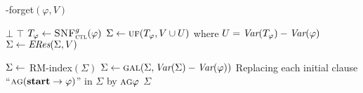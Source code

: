\begin{algorithm}[tb]
	\caption{{\CTL-forget}$(\varphi, V)$}
	\label{alg:compute:forgetting:by:Resolution}
	\LinesNumbered
	\lIf{$\varphi\equiv\bot$} {{\bf \Return $\bot$}}
	 {{\bf \Return  $\top$}}
	$T_\varphi \leftarrow {\textsc{SNF}_{\textsc{ctl}}^g}(\varphi)$ 
	$\Sigma\leftarrow \textsc{uf}(T_\varphi,V\cup U)$ where $U=\textit{Var}(T_\varphi)-\textit{Var}(\varphi)$
	$\Sigma\leftarrow \emph{ERes}(\Sigma,V)$ 
	
	$\Sigma\leftarrow$ {RM-index}$(\Sigma)$ 
	$\Sigma\leftarrow \textsc{gal}(\Sigma,\textit{Var}(\Sigma)-\textit{Var}(\varphi))$ 
	Replacing each initial clause ``$\textsc{a}\textsc{g}(\textbf{start}\rightarrow\varphi)$'' in $\Sigma$ by $\textsc{a}\textsc{g}\varphi$\;
	\Return $\Sigma$\;
\end{algorithm}



